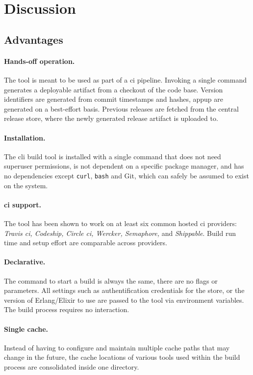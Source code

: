 \section{Discussion}


\subsection{Advantages}

\paragraph{Hands-off operation.} The tool is meant to be used as part of a \acrfull{ci} pipeline. Invoking a single command generates a deployable artifact from a checkout of the code base. Version identifiers are generated from commit timestamps and hashes, \acrfull{appup} are generated on a best-effort basis. Previous releases are fetched from the central release store, where the newly generated release artifact is uploaded to.

\paragraph{Installation.} The \acrshort{cli} build tool is installed with a single command that does not need superuser permissions, is not dependent on a specific package manager, and has no dependencies except \lstinline|curl|, \lstinline|bash| and Git, which can safely be assumed to exist on the system.

\paragraph{\acrshort{ci} support.} The tool has been shown to work on at least six common hosted \acrfull{ci} providers: \emph{Travis \acrshort{ci}, Codeship, Circle \acrshort{ci}, Wercker, Semaphore,} and \emph{Shippable}. Build run time and setup effort are comparable across providers.

\paragraph{Declarative.} The command to start a build is always the same, there are no flags or parameters. All settings such as authentification credentials for the store, or the version of Erlang/Elixir to use are passed to the tool via environment variables. The build process requires no interaction.

\paragraph{Single cache.}  Instead of having to configure and maintain multiple cache paths that may change in the future, the cache locations of various tools used within the build process are consolidated inside one directory.

